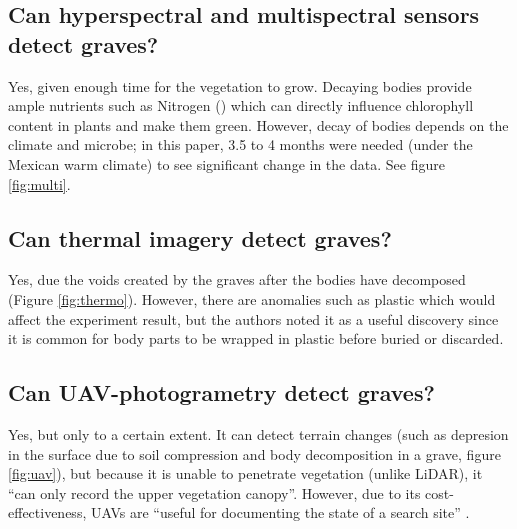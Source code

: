 \documentclass[12pt]{article}
\theoremstyle{plain}
\begin{document}
\subsection{Can hyperspectral and multispectral sensors detect graves?}
\label{subsec:spectral}
Yes, given enough time for the vegetation to grow. Decaying bodies provide ample
nutrients such as Nitrogen () which can directly influence chlorophyll
content in plants and make them green. However, decay of bodies depends on the
climate and microbe; in this paper, 3.5 to 4 months were needed (under the
Mexican warm climate) to see significant change in the data. See figure
\ref{fig:multi}.


\subsection{Can thermal imagery detect graves?}
\label{subsec:thermal}
Yes, due the voids created by the graves after the bodies have decomposed
(Figure \ref{fig:thermo}). However, there are anomalies such as plastic which
would affect the experiment result, but the authors noted it as a useful
discovery since it is common for body parts to be wrapped in plastic before
buried or discarded.

\subsection{Can UAV-photogrametry detect graves?}
\label{subsec:uav}
Yes, but only to a certain extent. It can detect terrain changes (such as
depresion in the surface due to soil compression and body decomposition in a
grave, figure \ref{fig:uav}), but because it is unable to penetrate vegetation
(unlike LiDAR), it ``can only record the upper vegetation canopy''. However, due to
its cost-effectiveness, UAVs are ``useful for documenting the state of a search
site'' \cite{SILVANCARDENAS2021111064}.




\end{document}
